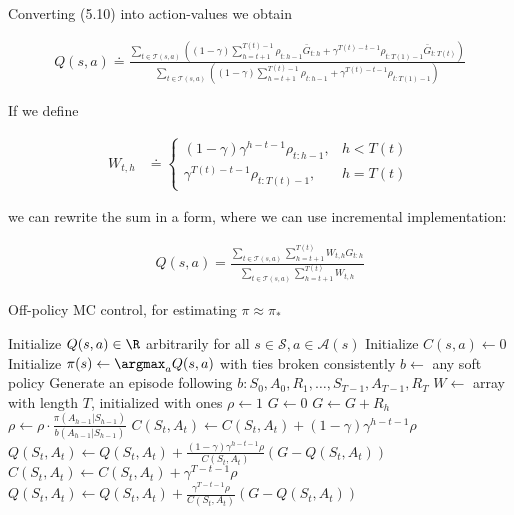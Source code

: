 \begin{solution}

Converting (5.10) into action-values we obtain

\begin{align*}
  Q(s,a) \doteq \frac{\sum_{t \in \mathcal{T}(s,a)}\left(
  (1 - \gamma)\sum_{h=t+1}^{T(t) - 1} \rho_{t:h-1}\bar{G}_{t:h} + 
  \gamma^{T(t) - t - 1} \rho_{t:T(1)-1}\bar{G}_{t:T(t)}\right)}
  {\sum_{t \in \mathcal{T}(s,a)}\left(
  (1 - \gamma)\sum_{h=t+1}^{T(t) - 1} \rho_{t:h-1} + 
  \gamma^{T(t) - t - 1} \rho_{t:T(1)-1}\right)}
\end{align*}

If we define

\begin{align*}
  W_{t,h} &\doteq \begin{cases}
    (1 - \gamma)\gamma^{h - t - 1}\rho_{t:h-1}, & h < T(t) \\
    \gamma^{T(t) - t - 1}\rho_{t:T(t) - 1}, & h = T(t)
  \end{cases}
\end{align*}

we can rewrite the sum in a form, where we can use incremental implementation:

\begin{align*}
  Q(s,a) = \frac{\sum_{t \in \mathcal{T}(s,a)}\sum_{h=t+1}^{T(t)}W_{t,h}G_{t:h}}
  {\sum_{t \in \mathcal{T}(s,a)}\sum_{h=t+1}^{T(t)}W_{t,h}}
\end{align*}
\begin{algorithm}
    \caption{Off-policy MC control, for estimating $\pi \approx \pi_*$}
    \begin{algorithmic}[1]
      \State Initialize $Q(s,a) \in \R$ arbitrarily for all $s \in \mathcal{S}, a \in \mathcal{A}(s)$
      \State Initialize $C(s,a) \leftarrow 0$
      \State Initialize $\pi(s) \leftarrow \argmax_a Q(s,a)$ with ties broken consistently
        \State $b \leftarrow$ any soft policy
        \State Generate an episode following $b: S_0,A_0,R_1,\dots,S_{T-1},A_{T-1},R_T$
        \State $W \leftarrow $ array with length $T$, initialized with ones
          \State $\rho \leftarrow 1$
          \State $G \leftarrow 0$
              \State $G \leftarrow G + R_h$
              \State $\rho \leftarrow \rho \cdot \frac{\pi(A_{h-1}|S_{h-1})}{b(A_{h-1}|S_{h-1})}$
                \State $C(S_t,A_t) \leftarrow C(S_t,A_t) + (1-\gamma)\gamma^{h - t - 1}\rho$
                \State $Q(S_t,A_t) \leftarrow Q(S_t,A_t) + 
                \frac{(1-\gamma)\gamma^{h - t - 1}\rho}{C(S_t,A_t)}(G - Q(S_t,A_t))$
              \Else
                \State $C(S_t,A_t) \leftarrow C(S_t,A_t) + \gamma^{T - t - 1}\rho$
                \State $Q(S_t,A_t) \leftarrow Q(S_t,A_t) + 
                \frac{\gamma^{T - t - 1}\rho}{C(S_t,A_t)}(G - Q(S_t,A_t))$
              \EndIf
            \EndFor
            \EndIf
        \EndFor
      \EndWhile
    \end{algorithmic}
\end{algorithm}

\FloatBarrier

\end{solution}


